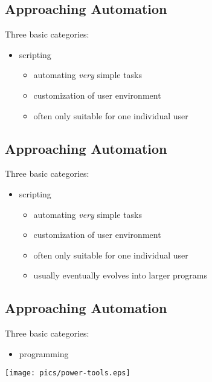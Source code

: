 \documentclass[xga]{xdvislides}
\begin{document}
\subsection{Approaching Automation}
Three basic categories:
\\

\begin{itemize}
	\item scripting
		\begin{itemize}
			\item automating {\em very} simple tasks
			\item customization of user environment
			\item often only suitable for one individual user
		\end{itemize}
\end{itemize}

\subsection{Approaching Automation}
Three basic categories:
\\

\begin{itemize}
	\item scripting
		\begin{itemize}
			\item automating {\em very} simple tasks
			\item customization of user environment
			\item often only suitable for one individual user
			\item usually eventually evolves into larger programs
		\end{itemize}
\end{itemize}

\subsection{Approaching Automation}
Three basic categories:
\\

\begin{itemize}
	\item programming
\end{itemize}
\vspace*{\fill}
\begin{center}
	\texttt{[image: pics/power-tools.eps]}
\end{center}
\vspace*{\fill}
\end{document}
